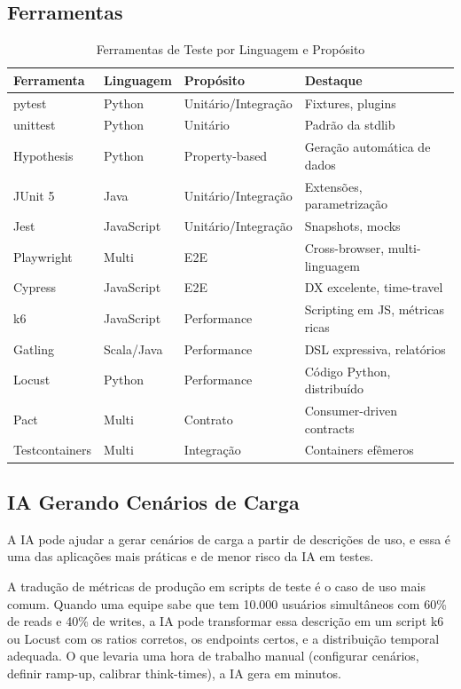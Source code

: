 \subsection{Ferramentas}

\begin{table}[htbp]
\centering
\caption{Ferramentas de Teste por Linguagem e Propósito}
\begin{tabular}{@{}llll@{}}
\toprule
\textbf{Ferramenta} & \textbf{Linguagem} & \textbf{Propósito} & \textbf{Destaque} \\
\midrule
pytest & Python & Unitário/Integração & Fixtures, plugins \\
unittest & Python & Unitário & Padrão da stdlib \\
Hypothesis & Python & Property-based & Geração automática de dados \\
JUnit 5 & Java & Unitário/Integração & Extensões, parametrização \\
Jest & JavaScript & Unitário/Integração & Snapshots, mocks \\
Playwright & Multi & E2E & Cross-browser, multi-linguagem \\
Cypress & JavaScript & E2E & DX excelente, time-travel \\
k6 & JavaScript & Performance & Scripting em JS, métricas ricas \\
Gatling & Scala/Java & Performance & DSL expressiva, relatórios \\
Locust & Python & Performance & Código Python, distribuído \\
Pact & Multi & Contrato & Consumer-driven contracts \\
Testcontainers & Multi & Integração & Containers efêmeros \\
\bottomrule
\end{tabular}
\end{table}

\subsection{IA Gerando Cenários de Carga}

A IA pode ajudar a gerar cenários de carga a partir de descrições de uso, e essa
é uma das aplicações mais práticas e de menor risco da IA em testes.

A tradução de métricas de produção em scripts de teste é o caso de uso mais
comum. Quando uma equipe sabe que tem 10.000 usuários simultâneos com 60\% de
reads e 40\% de writes, a IA pode transformar essa descrição em um script k6 ou
Locust com os ratios corretos, os endpoints certos, e a distribuição temporal
adequada. O que levaria uma hora de trabalho manual (configurar cenários,
definir ramp-up, calibrar think-times), a IA gera em minutos.

